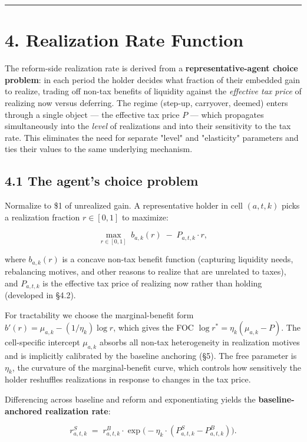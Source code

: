 \documentclass[11pt]{article}
\begin{document}
\par\medskip\hrule\medskip

\section*{4. Realization Rate Function}

The reform-side realization rate is derived from a \textbf{representative-agent choice problem}: in each period the holder decides what fraction of their embedded gain to realize, trading off non-tax benefits of liquidity against the \emph{effective tax price} of realizing now versus deferring. The regime (step-up, carryover, deemed) enters through a single object — the effective tax price $P$ — which propagates simultaneously into the \emph{level} of realizations and into their sensitivity to the tax rate. This eliminates the need for separate "level" and "elasticity" parameters and ties their values to the same underlying mechanism.

\subsection*{4.1 The agent's choice problem}

Normalize to \$1 of unrealized gain. A representative holder in cell $(a, t, k)$ picks a realization fraction $r \in [0, 1]$ to maximize:

\[
\max_{r \in [0,1]} \; b_{a,k}(r) \;-\; P_{a,t,k} \cdot r,
\]

where $b_{a,k}(r)$ is a concave non-tax benefit function (capturing liquidity needs, rebalancing motives, and other reasons to realize that are unrelated to taxes), and $P_{a,t,k}$ is the effective tax price of realizing now rather than holding (developed in §4.2).

For tractability we choose the marginal-benefit form $b'(r) = \mu_{a,k} - (1/\eta_k) \log r$, which gives the FOC $\log r^* = \eta_k (\mu_{a,k} - P)$. The cell-specific intercept $\mu_{a,k}$ absorbs all non-tax heterogeneity in realization motives and is implicitly calibrated by the baseline anchoring (§5). The free parameter is $\eta_k$, the curvature of the marginal-benefit curve, which controls how sensitively the holder reshuffles realizations in response to changes in the tax price.

Differencing across baseline and reform and exponentiating yields the \textbf{baseline-anchored realization rate}:

\[
\boxed{
r^S_{a,t,k}
\;=\;
r^B_{a,t,k} \cdot
\exp\!\big(\!-\eta_k \cdot (P^S_{a,t,k} - P^B_{a,t,k})\big).
}
\]
\end{document}
